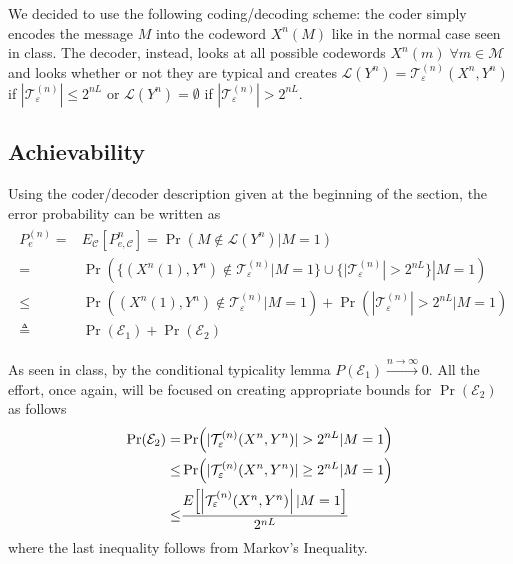 
\newcommand{\typical}{\ensuremath{\mathcal{T}_\varepsilon^{(n)}}}
\newcommand{\typicalLong}{\ensuremath{\mathcal{T}_\varepsilon^{(n)}(X^n,Y^n)}}

We decided to use the following coding/decoding scheme: the coder simply encodes the message $M$ into the codeword $X^n(M)$ like in the normal case seen in class. The decoder, instead, looks at all possible codewords $X^n(m) \; \forall m\in \mathcal{M}$ and looks whether or not they are typical and creates $\mathcal{L}(Y^n) = \typicalLong$ if $|\typical| \leq 2^{nL}$ or $\mathcal{L}(Y^n)=\emptyset$ if $|\typical| > 2^{nL}$.

\subsection{Achievability}
Using the coder/decoder description given at the beginning of the section, the error probability can be written as
%
\begin{align}
\begin{split}
P_e^{(n)}=&E_\mathcal{C}[P_{e,\mathcal{C}}^n] = \Pr( M\notin \mathcal{L}(Y^n) |M=1 )\\
=& \Pr( \{(X^n(1),Y^n)\notin\typical| M=1\} \cup \{ |\typical|>2^{nL} \}|M=1)\\
\leq& \Pr((X^n(1),Y^n)\notin\typical|M=1) + \Pr(|\typical|>2^{nL}|M=1)\\
\triangleq& \Pr(\mathcal{E}_1) + \Pr(\mathcal{E}_2)
\end{split}
\end{align}

As seen in class, by the conditional typicality lemma $P(\mathcal{E}_1) \xrightarrow{n\rightarrow\infty}0$. All the effort, once again, will be focused on creating appropriate bounds for $\Pr(\mathcal{E}_2)$ as follows
%
\begin{align} \label{eq:3.14_E2}
\begin{split}
\Pr(\mathcal{E}_2) =& \Pr(|\typicalLong|>2^{nL}|M=1)\\
 \leq& \Pr(|\typicalLong| \geq 2^{nL}|M=1)\\
\leq& \frac{E \qty[\qty|\typicalLong| \,|M=1]}{2^{nL}}
\end{split}
\end{align}
%
where the last inequality follows from Markov's Inequality.


